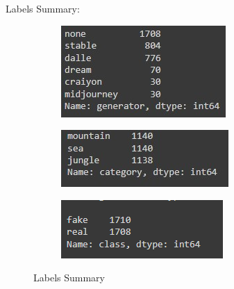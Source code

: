 \documentclass{template}
\begin{document}
Labels Summary:
\begin{figure}
  \centering
  \begin{subfigure}{0.3\textwidth}
    \includegraphics[width=\linewidth]{preprocessing1.jpg}
    \caption{}
    \label{fig:image1}
  \end{subfigure}
  \begin{subfigure}{0.3\textwidth}
    \includegraphics[width=\linewidth]{preprocessing2.jpg}
    \caption{}
    \label{fig:image2}
  \end{subfigure}
  \begin{subfigure}{0.3\textwidth}
    \includegraphics[width=\linewidth]{preprocessing3.jpg.png}
    \caption{}
    \label{fig:image3}
  \end{subfigure}
  \caption{Labels Summary}
  \label{fig:three_images}
\end{figure}
\newpage
\end{document}
